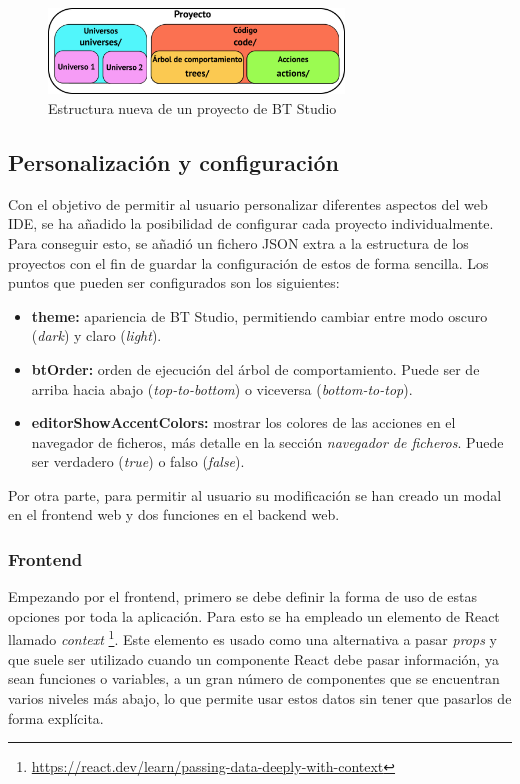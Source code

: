 \begin{figure}[H]
    \centering
    \includegraphics[width=0.7\textwidth]{figures/bt-avances/bt-proy-new.png}
    \caption{Estructura nueva de un proyecto de BT Studio}
    \label{fig:estructura-nueva}
\end{figure}

\subsection{Personalización y configuración}\label{sec:config}

Con el objetivo de permitir al usuario personalizar diferentes aspectos del web IDE, se ha añadido la posibilidad de configurar cada proyecto individualmente. Para conseguir esto, se añadió un fichero JSON extra a la estructura de los proyectos con el fin de guardar la configuración de estos de forma sencilla. Los puntos que pueden ser configurados son los siguientes:

\begin{itemize}
    \item \textbf{theme:} apariencia de BT Studio, permitiendo cambiar entre modo oscuro (\textit{dark}) y claro (\textit{light}).
    \item \textbf{btOrder:} orden de ejecución del árbol de comportamiento. Puede ser de arriba hacia abajo (\textit{top-to-bottom}) o viceversa (\textit{bottom-to-top}).
    \item \textbf{editorShowAccentColors:} mostrar los colores de las acciones en el navegador de ficheros, más detalle en la sección \textit{navegador de ficheros}. Puede ser verdadero (\textit{true}) o falso (\textit{false}).
\end{itemize}

Por otra parte, para permitir al usuario su modificación se han creado un modal en el frontend web y dos funciones en el backend web.

\subsubsection{Frontend}

Empezando por el frontend, primero se debe definir la forma de uso de estas opciones por toda la aplicación. Para esto se ha empleado un elemento de React llamado \textit{context} \footnote{\url{https://react.dev/learn/passing-data-deeply-with-context}}. Este elemento es usado como una alternativa a pasar \textit{props} y que suele ser utilizado cuando un componente React debe pasar información, ya sean funciones o variables, a un gran número de componentes que se encuentran varios niveles más abajo, lo que permite usar estos datos sin tener que pasarlos de forma explícita.

